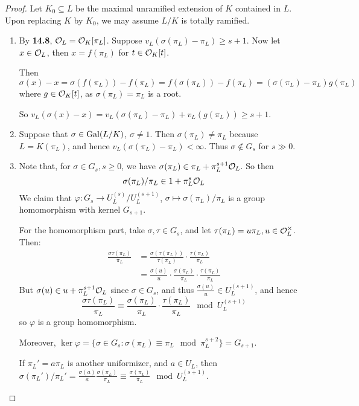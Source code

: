 \documentclass[10pt,a4paper]{article}
\begin{document}
\begin{proof}
  Let $K_0 \subseteq L$ be the maximal unramified extension of $K$ contained in $L$. Upon replacing $K$ by $K_0$, we may assume $L/K$ is totally ramified.
  \begin{enumerate}
    \item By \textbf{14.8}, $\mathcal{O}_L = \mathcal{O}_K[\pi_L]$. Suppose $v_L(\sigma(\pi_L)-\pi_L) \geq s+1$. Now let $x \in \mathcal{O}_L$, then $x = f(\pi_L)$ for $t \in \mathcal{O}_K[t]$.

    Then $\sigma(x)-x = \sigma(f(\pi_L))-f(\pi_L) = f(\sigma(\pi_L)) - f(\pi_L) = (\sigma(\pi_L) - \pi_L)g(\pi_L)$ where $g \in \mathcal{O}_K[t]$, as $\sigma(\pi_L) = \pi_L$ is a root.

    So $v_L(\sigma(x)-x) = v_L(\sigma(\pi_L)-\pi_L) + v_L(g(\pi_L)) \geq s+1$.

    \item Suppose that $\sigma \in \operatorname{Gal}(L/K)$, $\sigma \neq 1$. Then $\sigma(\pi_L)\neq \pi_L$ because $L = K(\pi_L)$, and hence $v_L(\sigma(\pi_L)-\pi_L) < \infty$. Thus $\sigma \notin G_s$ for $s \gg 0$.

    \item Note that, for $\sigma \in G_s, s \geq 0$, we have $\sigma(\pi_L) \in \pi_L + \pi_L^{s+1}\mathcal{O}_L$. So then
    \[\sigma(\pi_L)/\pi_L \in 1+ \pi_L^s \mathcal{O}_L\]
    We claim that $\varphi:G_s \to U_L^{(s)}/U_L^{(s+1)}$, $\sigma \mapsto \sigma(\pi_L)/\pi_L$ is a group homomorphism with kernel $G_{s+1}$.

    For the homomorphism part, take $\sigma, \tau \in G_s$, and let $\tau(\pi_L) = u\pi_L, u \in \mathcal{O}_L^\times$. Then:
    \begin{align*}
      \frac{\sigma\tau(\pi_L)}{\pi_L} &= \frac{\sigma(\tau(\pi_L))}{\tau(\pi_L)}\cdot \frac{\tau(\pi_L)}{\pi_L}\\
      &= \frac{\sigma(u)}{u}\cdot\frac{\sigma(\pi_L)}{\pi_L}\cdot\frac{\tau(\pi_L)}{\pi_L}
    \end{align*}
    But $\sigma(u)\in u+\pi_L^{s+1}\mathcal{O}_L$ since $\sigma \in G_s$, and thus $\frac{\sigma(u)}{u} \in U_L^{(s+1)}$, and hence
    \[\frac{\sigma\tau(\pi_L)}{\pi_L} \equiv \frac{\sigma(\pi_L)}{\pi_L}\cdot \frac{\tau(\pi_L)}{\pi_L}\mod U_L^{(s+1)}\]
    so $\varphi$ is a group homomorphism.

    Moreover, $\ker \varphi = \{\sigma\in G_s : \sigma(\pi_L)\equiv \pi_L \mod \pi_L^{s+2}\} = G_{s+1}$.

    If $\pi_L' = a\pi_L$ is another uniformizer, and $a \in U_L$, then $\sigma(\pi_L')/\pi_L' = \frac{\sigma(a)}{a}\frac{\sigma(\pi_L)}{\pi_L}\equiv \frac{\sigma(\pi_L)}{\pi_L} \mod U_L^{(s+1)}$.
  \end{enumerate}
\end{proof}
\end{document}
